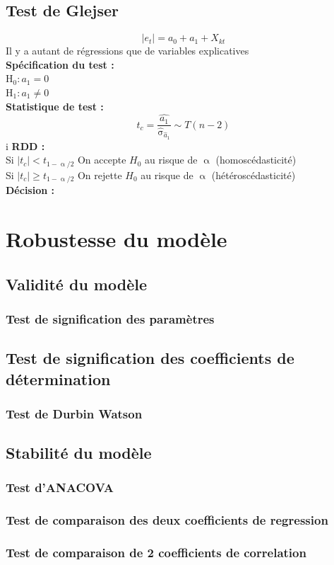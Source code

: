 \documentclass[A4paper]{article}
\begin{document}
\subsection{Test de Glejser}
\begin{equation*}
	|e_t| = a_0 + a_1 +X_{kt}
\end{equation*}
Il y a autant de régressions que de variables explicatives\\ 
\textbf{Spécification du test :}\\
H$_0 : a_1 = 0$\\
H$_1 : a_1 \neq 0$\\
\textbf{Statistique de test :}
\begin{equation*}
    t_c = \frac{\hat{a_1}}{\hat{\upsigma}_{\hat{a}_1}} \sim T(n-2)
\end{equation*}i
\textbf{RDD : } \\
Si $|t_c|< t_{1-\upalpha/2}$ On accepte $H_0$ au risque de $\upalpha$ (homoscédasticité)\\
Si $|t_c| \geq t_{1-\upalpha/2}$ On rejette $H_0$ au risque de $\upalpha$ (hétéroscédasticité)\\
\textbf{Décision :} \\

\section{Robustesse du modèle}
\subsection{Validité du modèle}
\subsubsection{Test de signification des paramètres}
\subsection{Test de signification des coefficients de détermination}
\subsubsection{Test de Durbin Watson}
\subsection{Stabilité du modèle}
\subsubsection{Test d'ANACOVA}
\subsubsection{Test de comparaison des deux coefficients de regression}
\subsubsection{Test de comparaison de 2 coefficients de correlation}
\end{document}
